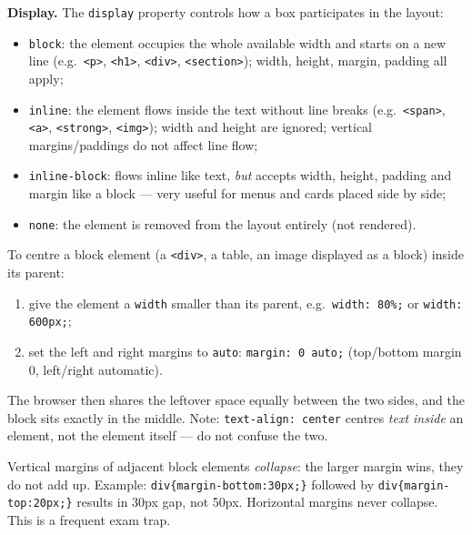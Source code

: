\documentclass[11pt]{article}
\newcounter{popsec}
\newcounter{popsub}
\newcommand{\courssub}[1]{%
  \stepcounter{popsub}%
  \par\vspace{9pt}\noindent{\popxbold\fontsize{11.5}{13}\selectfont\color{popink}{\color{poporange}\thepopsec.\thepopsub}\hspace{6pt}#1}\par\nopagebreak\vspace{4pt}
}
\begin{document}
\textbf{Display.} The \texttt{display} property controls how a box participates in the layout:
\begin{itemize}
\item \texttt{block}: the element occupies the whole available width and starts on a new line (e.g.\ \texttt{<p>}, \texttt{<h1>}, \texttt{<div>}, \texttt{<section>}); width, height, margin, padding all apply;
\item \texttt{inline}: the element flows inside the text without line breaks (e.g.\ \texttt{<span>}, \texttt{<a>}, \texttt{<strong>}, \texttt{<img>}); width and height are ignored; vertical margins/paddings do not affect line flow;
\item \texttt{inline-block}: flows inline like text, \emph{but} accepts width, height, padding and margin like a block --- very useful for menus and cards placed side by side;
\item \texttt{none}: the element is removed from the layout entirely (not rendered).
\end{itemize}

\begin{methode}
To centre a block element (a \texttt{<div>}, a table, an image displayed as a block) inside its parent:
\begin{enumerate}
\item give the element a \texttt{width} smaller than its parent, e.g.\ \texttt{width: 80\%;} or \texttt{width: 600px;};
\item set the left and right margins to \texttt{auto}: \texttt{margin: 0 auto;} (top/bottom margin 0, left/right automatic).
\end{enumerate}
The browser then shares the leftover space equally between the two sides, and the block sits exactly in the middle. Note: \texttt{text-align: center} centres \emph{text inside} an element, not the element itself --- do not confuse the two.
\end{methode}

\begin{attention}
Vertical margins of adjacent block elements \emph{collapse}: the larger margin wins, they do not add up. Example: \texttt{div\{margin-bottom:30px;\}} followed by \texttt{div\{margin-top:20px;\}} results in 30px gap, not 50px. Horizontal margins never collapse. This is a frequent exam trap.
\end{attention}

\courssub{Styling Tables and Forms}
\end{document}
